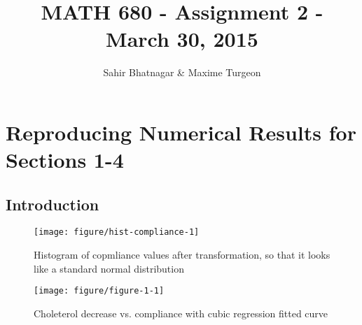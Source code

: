 \documentclass[11pt,letter]{article}\usepackage[]{graphicx}\usepackage[]{color}
\makeatletter
\def\maxwidth{ %
  \ifdim\Gin@nat@width>\linewidth
    \linewidth
  \else
    \Gin@nat@width
  \fi
}
\newenvironment{knitrout}{}{} %
\makeatother
\begin{document}
\pagestyle{fancy}


\title{MATH 680 - Assignment 2 - March 30, 2015}
\author{Sahir Bhatnagar \& Maxime Turgeon}

\maketitle


\section{Reproducing Numerical Results for Sections 1-4}






\subsection{Introduction}



\begin{knitrout}
\color{fgcolor}\begin{figure}

{\centering \texttt{[image: figure/hist-compliance-1]} 

}

\caption[Histogram of copmliance values after transformation, so that it looks like a standard normal distribution]{Histogram of copmliance values after transformation, so that it looks like a standard normal distribution}\label{fig:hist-compliance}
\end{figure}


\end{knitrout}

\begin{knitrout}
\color{fgcolor}\begin{figure}

{\centering \texttt{[image: figure/figure-1-1]} 

}

\caption[Choleterol decrease vs]{Choleterol decrease vs. compliance with cubic regression fitted curve}\label{fig:figure-1}
\end{figure}


\end{knitrout}
\end{document}
